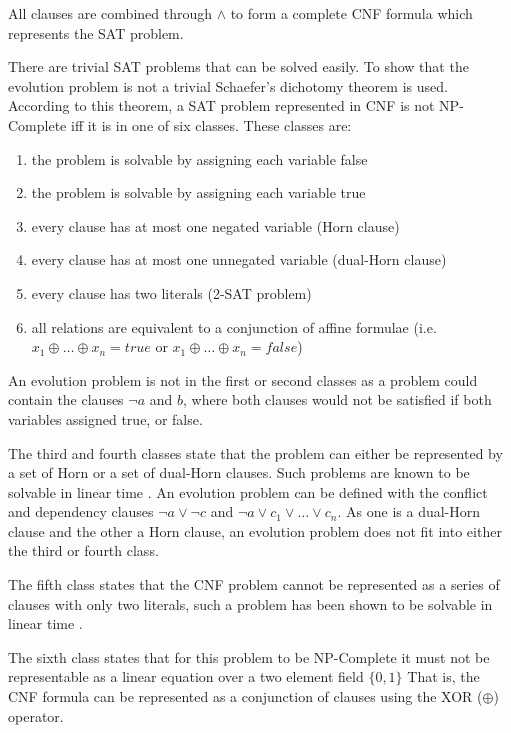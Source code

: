 All clauses are combined through $\wedge$ to form a complete CNF formula which represents the SAT problem.

There are trivial SAT problems that can be solved easily.
To show that the evolution problem is not a trivial Schaefer's dichotomy theorem \citep{Schaefer1978} is used.
According to this theorem, a SAT problem represented in CNF is not NP-Complete iff it is in one of six classes.
These classes are:
\begin{enumerate}
  \item the problem is solvable by assigning each variable false
  \item the problem is solvable by assigning each variable true
  \item every clause has at most one negated variable (Horn clause)
  \item every clause has at most one unnegated variable (dual-Horn clause)
  \item every clause has two literals (2-SAT problem)
  \item all relations are equivalent to a conjunction of affine formulae (i.e. $x_1 \oplus \ldots \oplus x_n = true$ or $x_1 \oplus \ldots \oplus x_n = false$)
\end{enumerate} 

An evolution problem is not in the first or second classes as a problem could contain the clauses $\neg a$ and $b$, 
where both clauses would not be satisfied if both variables assigned true, or false. 

The third and fourth classes state that the problem can either be represented by a set of Horn or a set of dual-Horn clauses.
Such problems are known to be solvable in linear time \citep{dowling1984linear}.
An evolution problem can be defined with the conflict and dependency clauses $\neg a \vee \neg c$ and $\neg a \vee c_1 \vee \ldots \vee c_n$. 
As one is a dual-Horn clause and the other a Horn clause, an evolution problem does not fit into either the third or fourth class.

The fifth class states that the CNF problem cannot be represented as a series of clauses with only two literals,
such a problem has been shown to be solvable in linear time \citep{aspvall1979linear}.

The sixth class states that for this problem to be NP-Complete it must not be representable as a linear equation over a two element field $\{0,1\}$
That is, the CNF formula can be represented as a conjunction of clauses using the XOR ($\oplus$) operator.
 
